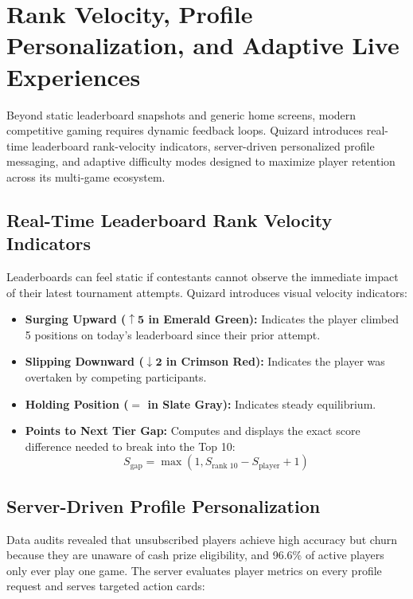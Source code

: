 \chapter{Rank Velocity, Profile Personalization, and Adaptive Live Experiences}

\begin{tcolorbox}[storybox, title={Advanced Engagement Architecture in Brief}]
Beyond static leaderboard snapshots and generic home screens, modern competitive gaming requires dynamic feedback loops. Quizard introduces real-time leaderboard rank-velocity indicators, server-driven personalized profile messaging, and adaptive difficulty modes designed to maximize player retention across its multi-game ecosystem.
\end{tcolorbox}

\section{Real-Time Leaderboard Rank Velocity Indicators}
Leaderboards can feel static if contestants cannot observe the immediate impact of their latest tournament attempts. Quizard introduces visual velocity indicators:

\begin{itemize}
    \item \textbf{Surging Upward ($\boldsymbol{\uparrow 5}$ in Emerald Green):} Indicates the player climbed 5 positions on today's leaderboard since their prior attempt.
    \item \textbf{Slipping Downward ($\boldsymbol{\downarrow 2}$ in Crimson Red):} Indicates the player was overtaken by competing participants.
    \item \textbf{Holding Position ($=$ in Slate Gray):} Indicates steady equilibrium.
    \item \textbf{Points to Next Tier Gap:} Computes and displays the exact score difference needed to break into the Top 10:
    \begin{equation}
    S_{\text{gap}} = \max\left(1, S_{\text{rank 10}} - S_{\text{player}} + 1\right)
    \end{equation}
\end{itemize}

\section{Server-Driven Profile Personalization}
Data audits revealed that unsubscribed players achieve high accuracy but churn because they are unaware of cash prize eligibility, and 96.6\% of active players only ever play one game. The server evaluates player metrics on every profile request and serves targeted action cards:

